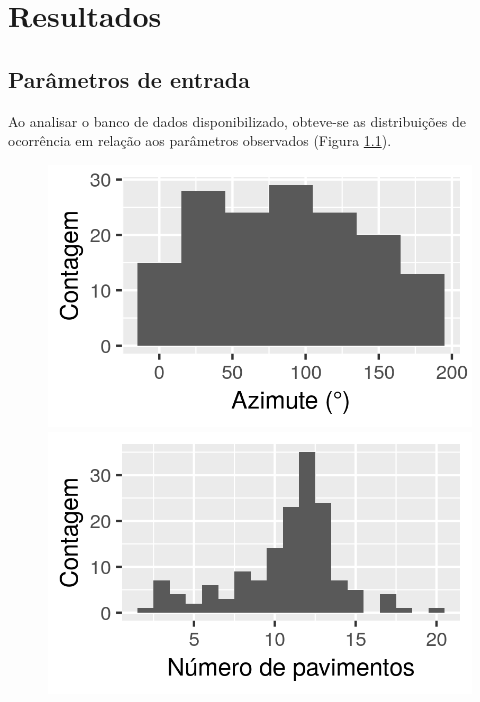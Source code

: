 \documentclass[brazil,hardcopy,openany,a4paper]{ufscthesis}
\begin{document}
	
	\frontmatter
	\folhaderosto[]%
	
	\mainmatter

	\chapter{Resultados}
	\label{chapter:Resultados}
	
	\section{Parâmetros de entrada}
	Ao analisar o banco de dados disponibilizado, obteve-se as distribuições de ocorrência em relação aos parâmetros observados (Figura \ref{fig:db_hist}).
		
	\begin{figure}[H]
		\label{fig:db_hist}
		\centering
		\begin{minipage}{.5\textwidth}
			\centering
			\includegraphics[width=\linewidth]{img/hist_azimute.png}
		\end{minipage}%
		\begin{minipage}{.5\textwidth}
			\centering
			\includegraphics[width=\linewidth]{img/hist_numero_pavimentos.png}

\end{minipage}
\end{figure}
\end{document}

